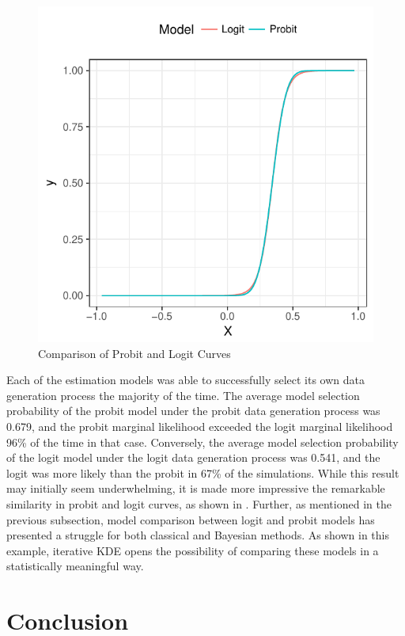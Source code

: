 \documentclass[twocolumn]{article}
\begin{document}
\begin{figure}
	\centering
	\includegraphics[width=\linewidth]{Probit-Logit-Fitted.pdf}
	\caption{Comparison of Probit and Logit Curves}
	\label{fig:Probit-Logit-Fit}
\end{figure}

Each of the estimation models was able to successfully select its own data generation process the majority of the time. The average model selection probability of the probit model under the probit data generation process was 0.679, and the probit marginal likelihood exceeded the logit marginal likelihood 96\% of the time in that case. Conversely, the average model selection probability of the logit model under the logit data generation process was 0.541, and the logit was more likely than the probit in 67\% of the simulations. While this result may initially seem underwhelming, it is made more impressive the remarkable similarity in probit and logit curves, as shown in . Further, as mentioned in the previous subsection, model comparison between logit and probit models has presented a struggle for both classical and Bayesian methods. As shown in this example, iterative KDE opens the possibility of comparing these models in a statistically meaningful way.

\section{Conclusion}



\end{document}

